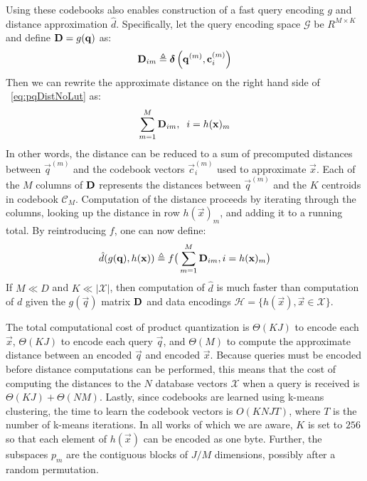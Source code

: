 Using these codebooks also enables construction of a fast query encoding $g$ and distance approximation $\hat{d}$. Specifically, let the query encoding space $\mathcal{G}$ be $R^{M \times K}$ and define $\mathbf{D} = g(\mathbf{q})$ as: %
\begin{align}
    \mathbf{D}_{im} \triangleq \boldsymbol{\delta} \left( \mathbf{q}^{(m)}, \mathbf{c}_i^{(m)} \right)
\end{align}
Then we can rewrite the approximate distance on the right hand side of ~\ref{eq:pqDistNoLut} as:
\begin{align} \label{eq:pqDist}
        \sum_{m=1}^M \mathbf{D}_{im}, \hspace{2mm} i = h(\mathbf{x})_m
\end{align}
In other words, the distance can be reduced to a sum of precomputed distances between $\vec{q}^{(m)}$ and the codebook vectors $\vec{c}_i^{(m)}$ used to approximate $\vec{x}$. Each of the $M$ columns of $\mathbf{D}$ represents the distances between $\vec{q}^{(m)}$ and the $K$ centroids in codebook $\mathcal{C}_M$. Computation of the distance proceeds by iterating through the columns, looking up the distance in row $h(\vec{x})_m$, and adding it to a running total. By reintroducing $f$, one can now define:
\begin{align} \label{eq:pq_dhat}
    \hat{d}(g(\mathbf{q}), h(\mathbf{x})) \triangleq f \big( \sum_{m=1}^M \mathbf{D}_{im}, i = h(\mathbf{x})_m \big)
\end{align}
If $M \ll D$ and $K \ll |\mathcal{X}|$, then computation of $\hat{d}$ is much faster than computation of $d$ given the $g(\vec{q})$ matrix $\mathbf{D}$ and data encodings $\mathcal{H} = \{h(\vec{x}), \vec{x} \in \mathcal{X} \}$.

The total computational cost of product quantization is $\Theta(KJ)$ to encode each $\vec{x}$, $\Theta(KJ)$ to encode each query $\vec{q}$, and $\Theta(M)$ to compute the approximate distance between an encoded $\vec{q}$ and encoded $\vec{x}$. Because queries must be encoded before distance computations can be performed, this means that the cost of computing the distances to the $N$ database vectors $\mathcal{X}$ when a query is received is $\Theta(KJ) + \Theta(NM)$. Lastly, since codebooks are learned using k-means clustering, the time to learn the codebook vectors is $O(KNJT)$, where $T$ is the number of k-means iterations. In all works of which we are aware, $K$ is set to $256$ so that each element of $h(\vec{x})$ can be encoded as one byte. Further, the subspaces $p_m$ are the contiguous blocks of $J/M$ dimensions, possibly after a random permutation.

